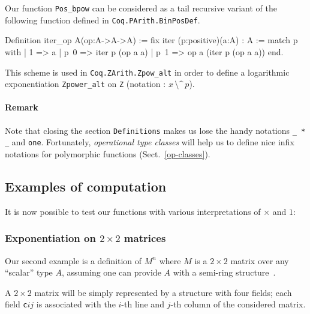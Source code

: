 \begin{remark}
Our function \texttt{Pos\_bpow} can be considered as a tail recursive variant
of the following function defined in \texttt{Coq.PArith.BinPosDef}.



\begin{Coqsrc}
Definition iter_op {A}(op:A->A->A) :=
  fix iter (p:positive)(a:A) : A :=
  match p with
    | 1 => a
    | p~0 => iter p (op a a)
    | p~1 => op a (iter p (op a a))
  end.
\end{Coqsrc}

This scheme is used in \texttt{Coq.ZArith.Zpow\_alt} in order to define a logarithmic exponentiation \texttt{Zpower\_alt} on \texttt{Z} (notation : $x\,\texttt{\^{}\^{}}\,p$).

\end{remark}

\paragraph*{Remark}
Note that closing the section \texttt{Definitions} makes us lose the
handy notations \texttt{\_ * \_} and \texttt{one}. Fortunately, \emph{operational type classes} will help us to define nice infix notations for polymorphic functions (Sect.~\vref{op-classes}).

\subsection{Examples of computation}
It is now possible to test our functions with various interpretations of
$\times$ and $1$:


\subsubsection{Exponentiation on $2\times 2$ matrices}
\label{naive-matrix}
Our second example is a definition of $M^n$ where $M$ is a $2\times 2$ matrix
over any ``scalar''  type $A$, assuming one can provide $A$ with a semi-ring structure~\cite{Coq}.



A $2\times 2$ matrix will be simply represented by a structure with four fields;
each field \texttt{c$ij$} is associated with the $i$-th line and $j$-th column of the considered matrix.

